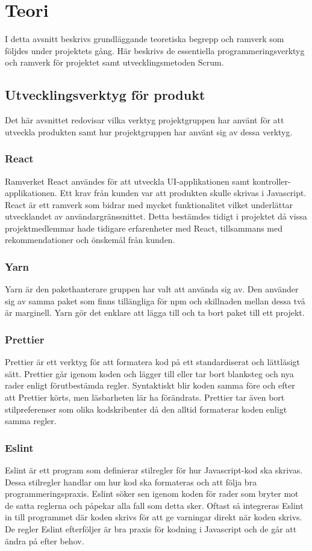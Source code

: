 \chapter{Teori}
\label{cha:theory}
I detta avsnitt beskrivs grundläggande teoretiska begrepp och ramverk som följdes under projektets gång. Här beskrivs de essentiella programmeringsverktyg och ramverk för projektet samt utvecklingsmetoden Scrum. 
\section{Utvecklingsverktyg för produkt}
Det här avsnittet redovisar vilka verktyg projektgruppen har använt för att utveckla produkten samt hur projektgruppen har använt sig av dessa verktyg.

\subsection*{React}
Ramverket React \cite{React} användes för att utveckla UI-applikationen samt kontroller-applikationen. Ett krav från kunden var att produkten skulle skrivas i Javascript. React är ett ramverk som bidrar med mycket funktionalitet vilket underlättar utvecklandet av användargränssnittet.  Detta bestämdes tidigt i projektet då vissa projektmedlemmar hade tidigare erfarenheter med React, tillsammans med rekommendationer och önskemål från kunden.

\subsection*{Yarn}
Yarn \cite{Yarn} är den pakethanterare gruppen har valt att använda sig av. Den använder sig av samma paket som finns tillängliga för npm och skillnaden mellan dessa två är marginell. Yarn gör det enklare att lägga till och ta bort paket till ett projekt.

\subsection*{Prettier}
Prettier \cite{prettier} är ett verktyg för att formatera kod på ett standardiserat och lättläsigt sätt. Prettier går igenom koden och lägger till eller tar bort blanksteg och nya rader enligt förutbestämda regler. Syntaktiskt blir koden samma före och efter att Prettier körts, men läsbarheten lär ha förändrats. Prettier tar även bort stilpreferenser som olika kodskribenter då den alltid formaterar koden enligt samma regler.


\subsection*{Eslint}
Eslint \cite{eslint} är ett program som definierar stilregler för hur Javascript-kod ska skrivas. Dessa stilregler handlar om hur kod ska formateras och att följa bra programmeringspraxis. Eslint söker sen igenom koden för rader som bryter mot de satta reglerna och påpekar alla fall som detta sker. Oftast så integreras Eslint in till programmet där koden skrivs för att ge varningar direkt när koden skrivs. De regler Eslint efterföljer är bra praxis för kodning i Javascript och de går att ändra på efter behov.

